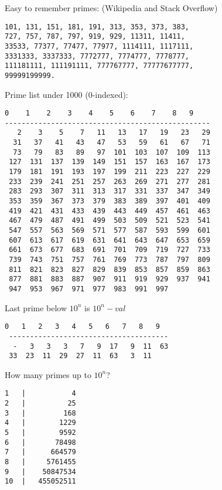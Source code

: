 Easy to remember primes: (Wikipedia and Stack Overflow)
\begin{lstlisting}
101, 131, 151, 181, 191, 313, 353, 373, 383,
727, 757, 787, 797, 919, 929, 11311, 11411,
33533, 77377, 77477, 77977, 1114111, 1117111,
3331333, 3337333, 7772777, 7774777, 7778777,
111181111, 111191111, 777767777, 77777677777,
99999199999.
\end{lstlisting}
Prime list under 1000 (0-indexed):
\begin{lstlisting}[firstnumber=-2]
   0    1    2    3    4    5    6    7    8   9
-------------------------------------------------
   2    3    5    7   11   13   17   19   23   29 
  31   37   41   43   47   53   59   61   67   71 
  73   79   83   89   97  101  103  107  109  113 
 127  131  137  139  149  151  157  163  167  173 
 179  181  191  193  197  199  211  223  227  229 
 233  239  241  251  257  263  269  271  277  281 
 283  293  307  311  313  317  331  337  347  349 
 353  359  367  373  379  383  389  397  401  409 
 419  421  431  433  439  443  449  457  461  463 
 467  479  487  491  499  503  509  521  523  541 
 547  557  563  569  571  577  587  593  599  601 
 607  613  617  619  631  641  643  647  653  659 
 661  673  677  683  691  701  709  719  727  733 
 739  743  751  757  761  769  773  787  797  809 
 811  821  823  827  829  839  853  857  859  863 
 877  881  883  887  907  911  919  929  937  941 
 947  953  967  971  977  983  991  997 
\end{lstlisting}
Last prime below $10^n$ is $10^n - val$
\begin{lstlisting}[firstnumber=-2]
  0   1   2   3   4   5   6   7   8   9
 --------------------------------------
  -   3   3   3   7   9  17   9  11  63
 33  23  11  29  27  11  63   3  11
\end{lstlisting}
How many primes up to $10^n$?
\begin{lstlisting}[firstnumber=-2]
1   |           4
2   |          25
3   |         168
4   |        1229
5   |        9592
6   |       78498
7   |      664579
8   |     5761455
9   |    50847534
10  |   455052511
\end{lstlisting}